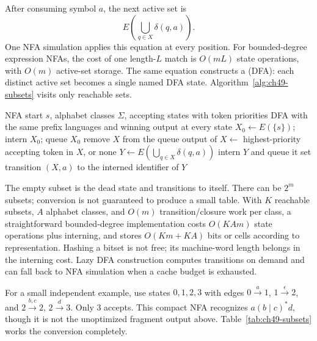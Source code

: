 After consuming symbol $a$, the next active set is
\[
 E\left(\bigcup_{q\in X}\delta(q,a)\right).
\]
One NFA simulation applies this equation at every position.
For bounded-degree expression NFAs, the cost of one length-$L$ match is $O(mL)$ state operations, with $O(m)$ active-set storage.
The same equation constructs a  (DFA): each distinct active set becomes a single named DFA state.
Algorithm~\ref{alg:ch49-subsets} visits only reachable sets.

\begin{algorithm}[htbp]
\caption{Intern reachable NFA subsets as DFA states.}
\label{alg:ch49-subsets}
\begin{pseudocode}
\Require NFA start $s$, alphabet classes $\Sigma$, accepting states with token priorities
\Ensure DFA with the same prefix languages and winning output at every state
\State $X_0\gets E(\{s\})$; intern $X_0$; queue $X_0$
  \State remove $X$ from the queue
  \State output of $X\gets$ highest-priority accepting token in $X$, or none
    \State $Y\gets E(\bigcup_{q\in X}\delta(q,a))$
      \State intern $Y$ and queue it
    \EndIf
    \State set transition $(X,a)$ to the interned identifier of $Y$
  \EndFor
\EndWhile
\end{pseudocode}
\end{algorithm}

The empty subset is the dead state and transitions to itself.
There can be $2^m$ subsets; conversion is not guaranteed to produce a small table.
With $K$ reachable subsets, $A$ alphabet classes, and $O(m)$ transition/closure work per class, a straightforward bounded-degree implementation costs $O(KAm)$ state operations plus interning, and stores $O(Km+KA)$ bits or cells according to representation.
Hashing a bitset is not free; its machine-word length belongs in the interning cost.
Lazy DFA construction computes transitions on demand and can fall back to NFA simulation when a cache budget is exhausted.

For a small independent example, use states $0,1,2,3$ with edges $0\xrightarrow{a}1$, $1\xrightarrow{\epsilon}2$, and $2\xrightarrow{b,c}2$, $2\xrightarrow{d}3$.
Only $3$ accepts.
This compact NFA recognizes $a(b\mid c)^*d$, though it is not the unoptimized fragment output above.
Table~\ref{tab:ch49-subsets} works the conversion completely.

